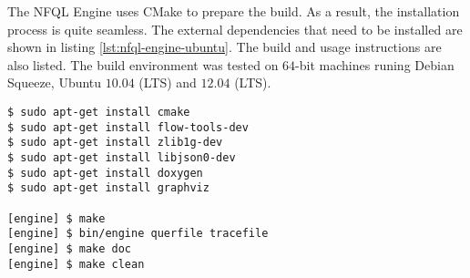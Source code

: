 The \ac{NFQL} Engine uses CMake to prepare the build. As a result, the
installation process is quite seamless.  The external dependencies that need
  to be installed are shown in listing
\ref{lst:nfql-engine-ubuntu}. The build and usage instructions are also
listed. The build environment was tested on $64$-bit machines runing Debian
Squeeze, Ubuntu $10.04$ (LTS) and $12.04$ (LTS).

\begin{lstlisting}
$ sudo apt-get install cmake
$ sudo apt-get install flow-tools-dev
$ sudo apt-get install zlib1g-dev
$ sudo apt-get install libjson0-dev
$ sudo apt-get install doxygen
$ sudo apt-get install graphviz

[engine] $ make
[engine] $ bin/engine querfile tracefile
[engine] $ make doc
[engine] $ make clean
\end{lstlisting}
